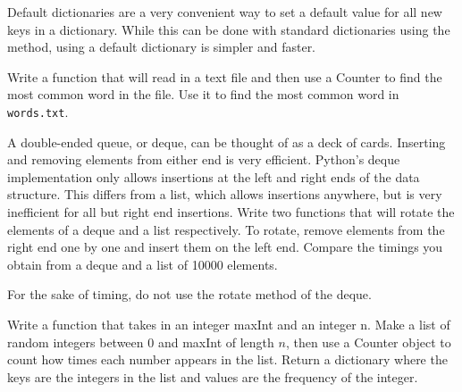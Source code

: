 Default dictionaries are a very convenient way to set a default value for all new keys in a dictionary.
While this can be done with standard dictionaries using the  method, using a default dictionary is simpler and faster.

\begin{problem}
Write a function that will read in a text file and then use a Counter to find the most common word in the file. Use it to find the most common word in \texttt{words.txt}.
\end{problem}

\begin{problem}
A double-ended queue, or deque, can be thought of as a deck of cards.
Inserting and removing elements from either end is very efficient.
Python's deque implementation only allows insertions at the left and right ends of the data structure.
This differs from a list, which allows insertions anywhere, but is very inefficient for all but right end insertions.
Write two functions that will rotate the elements of a deque and a list respectively.
To rotate, remove elements from the right end one by one and insert them on the left end.
Compare the timings you obtain from a deque and a list of 10000 elements.

For the sake of timing, do not use the rotate method of the deque.
\end{problem}

\begin{problem}
Write a function that takes in an integer maxInt and an integer n.
Make a list of random integers between 0 and maxInt of length $n$, then use a Counter object to count how times each number appears in the list.
Return a dictionary where the keys are the integers in the list and values are the frequency of the integer.
\end{problem}
